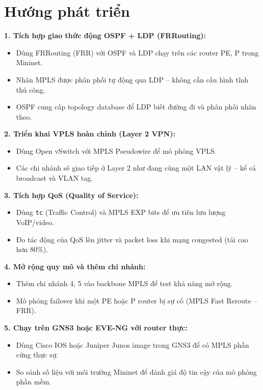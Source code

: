 \section{Hướng phát triển}

\textbf{1. Tích hợp giao thức động OSPF + LDP (FRRouting):}
\begin{itemize}
    \item Dùng FRRouting (FRR) với OSPF và LDP chạy trên các router PE, P trong Mininet.
    \item Nhãn MPLS được phân phối tự động qua LDP -- không cần cấu hình tĩnh thủ công.
    \item OSPF cung cấp topology database để LDP biết đường đi và phân phối nhãn theo.
\end{itemize}

\textbf{2. Triển khai VPLS hoàn chỉnh (Layer 2 VPN):}
\begin{itemize}
    \item Dùng Open vSwitch với MPLS Pseudowire để mô phỏng VPLS.
    \item Các chi nhánh sẽ giao tiếp ở Layer 2 như đang cùng một LAN vật lý -- kể cả broadcast và VLAN tag.
\end{itemize}

\textbf{3. Tích hợp QoS (Quality of Service):}
\begin{itemize}
    \item Dùng \texttt{tc} (Traffic Control) và MPLS EXP bits để ưu tiên lưu lượng VoIP/video.
    \item Đo tác động của QoS lên jitter và packet loss khi mạng congested (tải cao hơn 80\%).
\end{itemize}

\textbf{4. Mở rộng quy mô và thêm chi nhánh:}
\begin{itemize}
    \item Thêm chi nhánh 4, 5 vào backbone MPLS để test khả năng mở rộng.
    \item Mô phỏng failover khi một PE hoặc P router bị sự cố (MPLS Fast Reroute -- FRR).
\end{itemize}

\textbf{5. Chạy trên GNS3 hoặc EVE-NG với router thực:}
\begin{itemize}
    \item Dùng Cisco IOS hoặc Juniper Junos image trong GNS3 để có MPLS phần cứng thực sự.
    \item So sánh số liệu với môi trường Mininet để đánh giá độ tin cậy của mô phỏng phần mềm.
\end{itemize}

